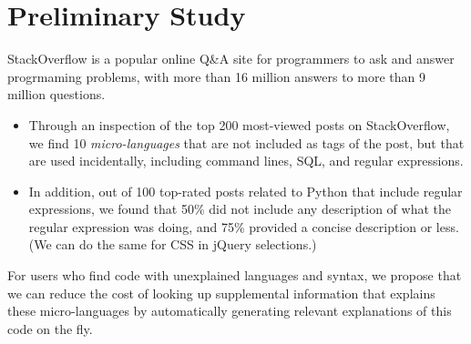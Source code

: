 \section{Preliminary Study}


StackOverflow is a popular online Q\&A site for programmers to ask and answer progrmaming problems, with more than 16 million answers to more than 9 million questions.

\begin{itemize}
\item Through an inspection of the top 200 most-viewed posts on StackOverflow, we find 10 \emph{micro-languages} that are not included as tags of the post, but that are used incidentally, including command lines, SQL, and regular expressions. 
\item In addition, out of 100 top-rated posts related to Python that include regular expressions, we found that 50\% did not include any description of what the regular expression was doing, and 75\% provided a concise description or less.
(We can do the same for CSS in jQuery selections.)
\end{itemize}

For users who find code with unexplained languages and syntax, we propose that we can reduce the cost of looking up supplemental information that explains these micro-languages by automatically generating relevant explanations of this code on the fly.
